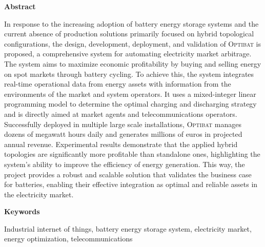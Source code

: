 \begin{center}
  {\bf \huge Abstract}
\end{center}

\vspace{1cm}

In response to the increasing adoption of battery energy storage systems and the current absence of production solutions primarily focused on hybrid topological configurations, the design, development, deployment, and validation of \textsc{Optibat} is proposed, a comprehensive system for automating electricity market arbitrage. The system aims to maximize economic profitability by buying and selling energy on spot markets through battery cycling. To achieve this, the system integrates real-time operational data from energy assets with information from the environments of the market and system operators. It uses a mixed-integer linear programming model to determine the optimal charging and discharging strategy and is directly aimed at market agents and telecommunications operators. Successfully deployed in multiple large scale installations, \textsc{Optibat} manages dozens of megawatt hours daily and generates millions of euros in projected annual revenue. Experimental results demonstrate that the applied hybrid topologies are significantly more profitable than standalone ones, highlighting the system's ability to improve the efficiency of energy generation. This way, the project provides a robust and scalable solution that validates the business case for batteries, enabling their effective integration as optimal and reliable assets in the electricity market.

\vspace{1cm}

\begin{center}
  {\bf \large Keywords}
\end{center}

\vspace{0.5cm}

Industrial internet of things, battery energy storage system, electricity market, energy optimization, telecommunications
